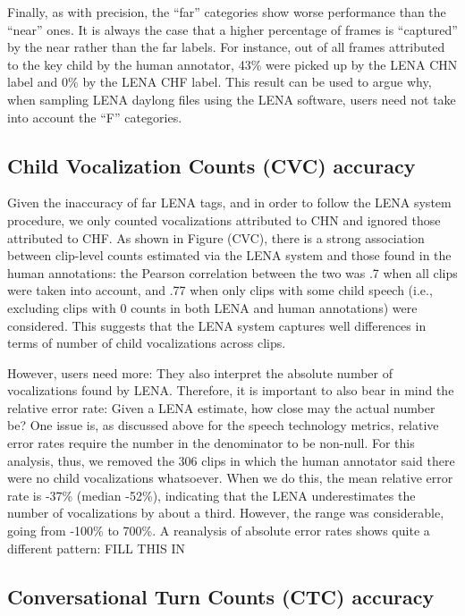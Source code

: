 \documentclass[english,floatsintext,man]{apa6}
\begin{document}
Finally, as with precision, the \enquote{far} categories show worse
performance than the \enquote{near} ones. It is always the case that a
higher percentage of frames is \enquote{captured} by the near rather
than the far labels. For instance, out of all frames attributed to the
key child by the human annotator, 43\% were picked up by the LENA CHN
label and 0\% by the LENA CHF label. This result can be used to argue
why, when sampling LENA daylong files using the LENA software, users
need not take into account the \enquote{F} categories.

\subsection{Child Vocalization Counts (CVC)
accuracy}\label{child-vocalization-counts-cvc-accuracy}

Given the inaccuracy of far LENA tags, and in order to follow the LENA
system procedure, we only counted vocalizations attributed to CHN and
ignored those attributed to CHF. As shown in Figure (CVC), there is a
strong association between clip-level counts estimated via the LENA
system and those found in the human annotations: the Pearson correlation
between the two was .7 when all clips were taken into account, and .77
when only clips with some child speech (i.e., excluding clips with 0
counts in both LENA and human annotations) were considered. This
suggests that the LENA system captures well differences in terms of
number of child vocalizations across clips.

However, users need more: They also interpret the absolute number of
vocalizations found by LENA. Therefore, it is important to also bear in
mind the relative error rate: Given a LENA estimate, how close may the
actual number be? One issue is, as discussed above for the speech
technology metrics, relative error rates require the number in the
denominator to be non-null. For this analysis, thus, we removed the 306
clips in which the human annotator said there were no child
vocalizations whatsoever. When we do this, the mean relative error rate
is -37\% (median -52\%), indicating that the LENA underestimates the
number of vocalizations by about a third. However, the range was
considerable, going from -100\% to 700\%. A reanalysis of absolute error
rates shows quite a different pattern: FILL THIS IN

\subsection{Conversational Turn Counts (CTC)
accuracy}\label{conversational-turn-counts-ctc-accuracy}
\end{document}
